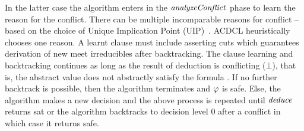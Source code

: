 In the latter case the algorithm enters in the $\mathit{analyzeConflict}$
phase to learn the reason for the conflict.   There can be multiple
incomparable reasons for conflict  -- based on the choice of Unique
Implication Point (UIP)~\cite{cdcl}.  ACDCL heuristically chooses one
reason.  A learnt clause must include asserting cuts which guarantees
derivation of new meet irreducibles after backtracking. The clause
learning and backtracking continues as long as the result of deduction
is conflicting ($\bot$), that is, the abstract value does not
abstractly satisfy the formula .  If no further
backtrack is possible, then the algorithm terminates and $\varphi$ is
\textsf{safe}. Else, the algorithm makes a new decision and the above
process is repeated until $\mathit{deduce}$ returns \textsf{sat} or the
algorithm backtracks to decision level 0 after a conflict in which
case it returns \textsf{safe}.

